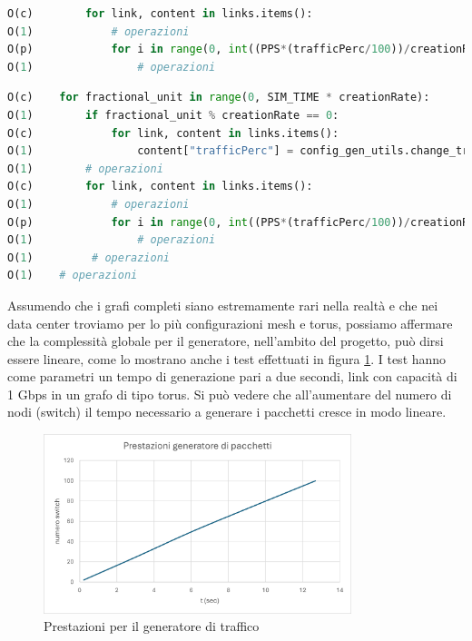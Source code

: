 \documentclass[binding=0.6cm]{sapthesis}
\begin{document}
{\scriptsize
\begin{lstlisting}[language=Python, basicstyle=\ttfamily, caption={Complessità per numero di links di un grafo completo}, label={codice:create_packets_n_links}, breaklines=true]
O(c)        for link, content in links.items():
O(1)            # operazioni
O(p)            for i in range(0, int((PPS*(trafficPerc/100))/creationRate)):
O(1)                # operazioni  
\end{lstlisting}
}


{\scriptsize
\begin{lstlisting}[language=Python, basicstyle=\ttfamily, caption={Complessità della logica di creazione pacchetti}, label={codice:create_packets_complexity}, breaklines=true]
O(c)    for fractional_unit in range(0, SIM_TIME * creationRate):
O(1)        if fractional_unit % creationRate == 0:
O(c)            for link, content in links.items():
O(1)                content["trafficPerc"] = config_gen_utils.change_traffic_perc(content["trafficPerc"], setup["trafficVariation"])
O(1)        # operazioni
O(c)        for link, content in links.items():
O(1)            # operazioni
O(p)            for i in range(0, int((PPS*(trafficPerc/100))/creationRate)):
O(1)                # operazioni
O(1)         # operazioni
O(1)    # operazioni
\end{lstlisting}
}

Assumendo che i grafi completi siano estremamente rari nella realtà e che nei data center troviamo per lo più configurazioni mesh e torus, possiamo
affermare che la complessità globale per il generatore, nell'ambito del progetto, può dirsi essere lineare, come lo mostrano anche i test effettuati in figura \ref{fig:prestazioni_config_gen}.
I test hanno come parametri un tempo di generazione pari a due secondi, link con capacità di 1 Gbps in un grafo di tipo torus.
Si può vedere che all'aumentare del numero di nodi (switch) il tempo necessario a generare i pacchetti cresce in modo lineare.

\begin{figure}[h]
    \centering
    \includegraphics[width=0.8\textwidth]{immagini/prestazioni_config_gen.png}
    \caption{Prestazioni per il generatore di traffico}
    \label{fig:prestazioni_config_gen}
\end{figure}
\end{document}
